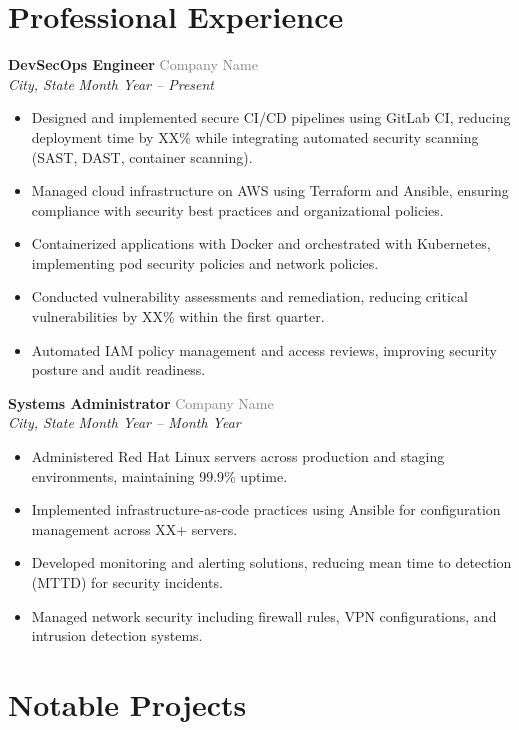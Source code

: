 \documentclass[11pt,letterpaper]{article}
\newcommand{\position}[4]{%
    \textbf{\large #1} \hfill \textcolor{graytext}{#2} \\
    \textit{\color{graytext}#3} \hfill \textit{\color{graytext}#4}
    \vspace{4pt}
}
\begin{document}
\section{Professional Experience}

\position{DevSecOps Engineer}{Company Name}{City, State}{Month Year -- Present}
\begin{itemize}
    \item Designed and implemented secure CI/CD pipelines using GitLab CI, reducing deployment time by XX\% while integrating automated security scanning (SAST, DAST, container scanning).
    \item Managed cloud infrastructure on AWS using Terraform and Ansible, ensuring compliance with security best practices and organizational policies.
    \item Containerized applications with Docker and orchestrated with Kubernetes, implementing pod security policies and network policies.
    \item Conducted vulnerability assessments and remediation, reducing critical vulnerabilities by XX\% within the first quarter.
    \item Automated IAM policy management and access reviews, improving security posture and audit readiness.
\end{itemize}

\vspace{0.6em}

\position{Systems Administrator}{Company Name}{City, State}{Month Year -- Month Year}
\begin{itemize}
    \item Administered Red Hat Linux servers across production and staging environments, maintaining 99.9\% uptime.
    \item Implemented infrastructure-as-code practices using Ansible for configuration management across XX+ servers.
    \item Developed monitoring and alerting solutions, reducing mean time to detection (MTTD) for security incidents.
    \item Managed network security including firewall rules, VPN configurations, and intrusion detection systems.
\end{itemize}

\section{Notable Projects}
\end{document}
